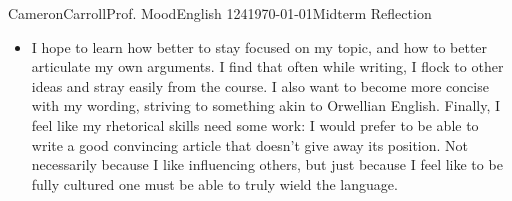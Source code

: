 \documentclass[12pt,letterpaper]{article}
\begin{document}
\begin{mla}{Cameron}{Carroll}{Prof. Mood}{English 124}{\today}{Midterm Reflection}
\begin{itemize}
\begin {enumerate}
\item I've learned that region and culture make a huge difference in language, which makes a difference in the person. For example, asian cultures have much shorter 'counting numbers,' which allows them to memorize more arbitrary digits than an equivalent westerner, on average. This partially explains the excellence at math, but also applies to language. Certain aspects of Japanese culture give them reason to create a word for which we can only construct a rough phrase. \\

\end{enumerate}

\item I hope to learn how better to stay focused on my topic, and how to better articulate my own arguments. I find that often while writing, I flock to other ideas and stray easily from the course. I also want to become more concise with my wording, striving to something akin to Orwellian English. Finally, I feel like my rhetorical skills need some work: I would prefer to be able to write a good convincing article that doesn't give away its position. Not necessarily because I like influencing others, but just because I feel like to be fully cultured one must be able to truly wield the language.


\end{itemize}


\end{mla}
\end{document}
